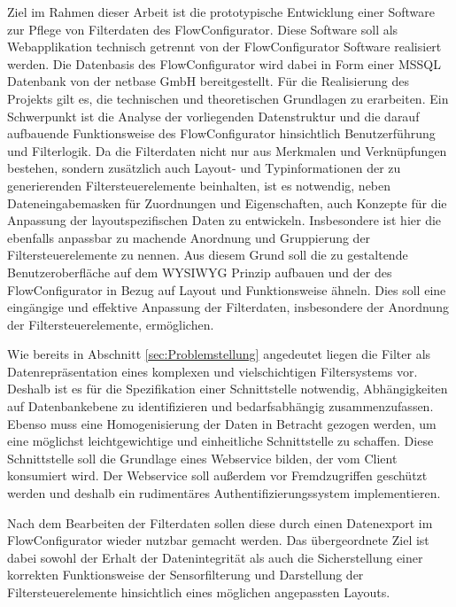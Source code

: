Ziel im Rahmen dieser Arbeit ist die prototypische Entwicklung einer Software zur Pflege von Filterdaten des FlowConfigurator. Diese Software soll als Webapplikation technisch getrennt von der FlowConfigurator Software realisiert werden. Die Datenbasis des FlowConfigurator wird dabei in Form einer \ac{MSSQL} Datenbank von der netbase GmbH bereitgestellt. Für die Realisierung des Projekts gilt es, die technischen und theoretischen Grundlagen zu erarbeiten. Ein Schwerpunkt ist die Analyse der vorliegenden Datenstruktur und die darauf aufbauende Funktionsweise des FlowConfigurator hinsichtlich Benutzerführung und Filterlogik. Da die Filterdaten nicht nur aus Merkmalen und Verknüpfungen bestehen, sondern zusätzlich auch Layout- und Typinformationen der zu generierenden Filtersteuerelemente beinhalten, ist es notwendig, neben Dateneingabemasken für Zuordnungen und Eigenschaften, auch Konzepte für die Anpassung der layoutspezifischen Daten zu entwickeln. Insbesondere ist hier die ebenfalls anpassbar zu machende Anordnung und Gruppierung der Filtersteuerelemente zu nennen. Aus diesem Grund soll die zu gestaltende Benutzeroberfläche auf dem \ac{WYSIWYG} Prinzip aufbauen und der des FlowConfigurator in Bezug auf Layout und Funktionsweise ähneln. Dies soll eine eingängige und effektive Anpassung der Filterdaten, insbesondere der Anordnung der Filtersteuerelemente, ermöglichen. 

Wie bereits in Abschnitt \ref{sec:Problemstellung} angedeutet liegen die Filter als Datenrepräsentation eines komplexen und vielschichtigen Filtersystems vor. Deshalb ist es für die Spezifikation einer Schnittstelle notwendig, Abhängigkeiten auf Datenbankebene zu identifizieren und bedarfsabhängig zusammenzufassen.  Ebenso muss eine Homogenisierung der Daten in Betracht gezogen werden, um eine möglichst leichtgewichtige und einheitliche Schnittstelle zu schaffen. Diese Schnittstelle soll die Grundlage eines Webservice bilden, der vom Client konsumiert wird. Der Webservice soll außerdem vor Fremdzugriffen geschützt werden und deshalb ein rudimentäres Authentifizierungssystem implementieren.

Nach dem Bearbeiten der Filterdaten sollen diese durch einen Datenexport im FlowConfigurator wieder nutzbar gemacht werden. Das übergeordnete Ziel ist dabei sowohl der Erhalt der Datenintegrität als auch die Sicherstellung einer korrekten Funktionsweise der Sensorfilterung und Darstellung der Filtersteuerelemente hinsichtlich eines möglichen angepassten Layouts.

\newpage

